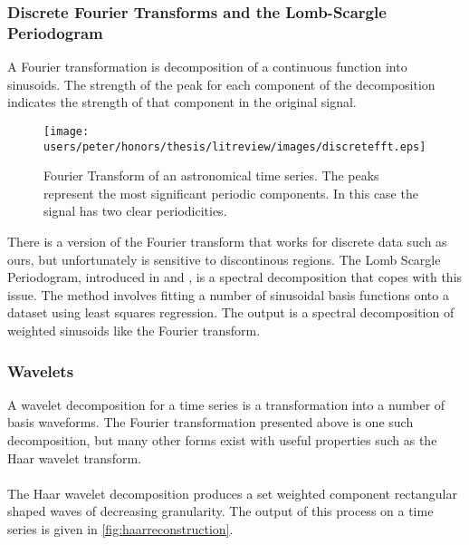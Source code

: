 	\subsubsection{Discrete Fourier Transforms and the Lomb-Scargle Periodogram}
	A Fourier transformation is decomposition of a continuous function into sinusoids. The strength of the peak for each component of the decomposition indicates the strength of that component in the original signal. 
	\begin{figure}[ht!]
	\centering
	\texttt{[image: users/peter/honors/thesis/litreview/images/discretefft.eps]}
	\label{fig:fouriertransform}
	\caption{Fourier Transform of an astronomical time series. The peaks represent the most significant periodic components. In this case the signal has two clear periodicities.}
	\end{figure}
	There is a version of the Fourier transform that works for discrete data such as ours, but unfortunately is sensitive to discontinous regions. The Lomb Scargle Periodogram, introduced in \citep{lomb1976least} and \citep{scargle1982studies}, is a spectral decomposition that copes with this issue. The method involves fitting a number of sinusoidal basis functions onto a dataset using least squares regression. The output is a spectral decomposition of weighted sinusoids like the Fourier transform.
	

	\subsubsection{Wavelets}
	A wavelet decomposition for a time series is a transformation into a number of basis waveforms. The Fourier transformation presented above is one such decomposition, but many other forms exist with useful properties such as the Haar wavelet transform. 
	\paragraph{}
	The Haar wavelet decomposition produces a set weighted component rectangular shaped waves of decreasing granularity. The output of this process on a time series is given in \ref{fig:haarreconstruction}.

